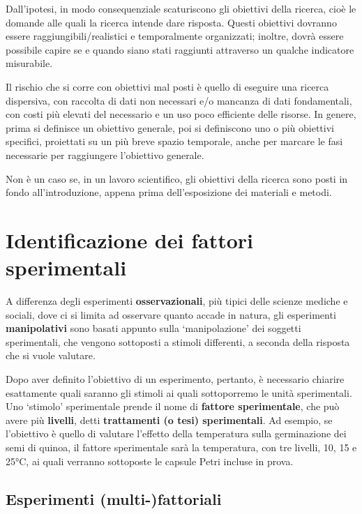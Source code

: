 \documentclass[
  12pt,
]{book}
\begin{document}
Dall'ipotesi, in modo consequenziale scaturiscono gli obiettivi della ricerca, cioè le domande alle quali la ricerca intende dare risposta. Questi obiettivi dovranno essere raggiungibili/realistici e temporalmente organizzati; inoltre, dovrà essere possibile capire se e quando siano stati raggiunti attraverso un qualche indicatore misurabile.

Il rischio che si corre con obiettivi mal posti è quello di eseguire una ricerca dispersiva, con raccolta di dati non necessari e/o mancanza di dati fondamentali, con costi più elevati del necessario e un uso poco efficiente delle risorse. In genere, prima si definisce un obiettivo generale, poi si definiscono uno o più obiettivi specifici, proiettati su un più breve spazio temporale, anche per marcare le fasi necessarie per raggiungere l'obiettivo generale.

Non è un caso se, in un lavoro scientifico, gli obiettivi della ricerca sono posti in fondo all'introduzione, appena prima dell'esposizione dei materiali e metodi.

\hypertarget{identificazione-dei-fattori-sperimentali}{%
\section{Identificazione dei fattori sperimentali}\label{identificazione-dei-fattori-sperimentali}}

A differenza degli esperimenti \textbf{osservazionali}, più tipici delle scienze mediche e sociali, dove ci si limita ad osservare quanto accade in natura, gli esperimenti \textbf{manipolativi} sono basati appunto sulla `manipolazione' dei soggetti sperimentali, che vengono sottoposti a stimoli differenti, a seconda della risposta che si vuole valutare.

Dopo aver definito l'obiettivo di un esperimento, pertanto, è necessario chiarire esattamente quali saranno gli stimoli ai quali sottoporremo le unità sperimentali. Uno `stimolo' sperimentale prende il nome di \textbf{fattore sperimentale}, che può avere più \textbf{livelli}, detti \textbf{trattamenti (o tesi) sperimentali}. Ad esempio, se l'obiettivo è quello di valutare l'effetto della temperatura sulla germinazione dei semi di quinoa, il fattore sperimentale sarà la temperatura, con tre livelli, 10, 15 e 25°C, ai quali verranno sottoposte le capsule Petri incluse in prova.

\hypertarget{esperimenti-multi-fattoriali}{%
\subsection{Esperimenti (multi-)fattoriali}\label{esperimenti-multi-fattoriali}}
\end{document}
